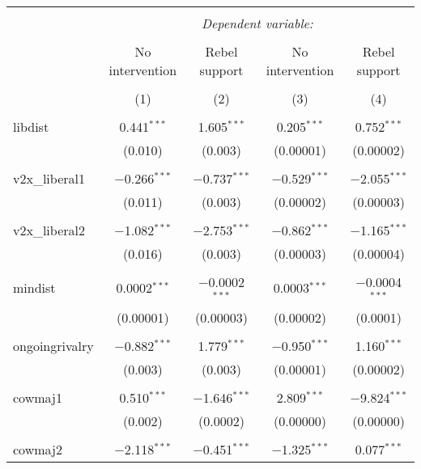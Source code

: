 
\begin{table}[!htbp] \centering 
  \caption{} 
  \label{} 
\begin{tabular}{@{\extracolsep{5pt}}lcccc} 
\\[-1.8ex]\hline 
\hline \\[-1.8ex] 
 & \multicolumn{4}{c}{\textit{Dependent variable:}} \\ 
\cline{2-5} 
\\[-1.8ex] & No intervention & Rebel support & No intervention & Rebel support \\ 
\\[-1.8ex] & (1) & (2) & (3) & (4)\\ 
\hline \\[-1.8ex] 
 libdist & 0.441$^{***}$ & 1.605$^{***}$ & 0.205$^{***}$ & 0.752$^{***}$ \\ 
  & (0.010) & (0.003) & (0.00001) & (0.00002) \\ 
  & & & & \\ 
 v2x\_liberal1 & $-$0.266$^{***}$ & $-$0.737$^{***}$ & $-$0.529$^{***}$ & $-$2.055$^{***}$ \\ 
  & (0.011) & (0.003) & (0.00002) & (0.00003) \\ 
  & & & & \\ 
 v2x\_liberal2 & $-$1.082$^{***}$ & $-$2.753$^{***}$ & $-$0.862$^{***}$ & $-$1.165$^{***}$ \\ 
  & (0.016) & (0.003) & (0.00003) & (0.00004) \\ 
  & & & & \\ 
 mindist & 0.0002$^{***}$ & $-$0.0002$^{***}$ & 0.0003$^{***}$ & $-$0.0004$^{***}$ \\ 
  & (0.00001) & (0.00003) & (0.00002) & (0.0001) \\ 
  & & & & \\ 
 ongoingrivalry & $-$0.882$^{***}$ & 1.779$^{***}$ & $-$0.950$^{***}$ & 1.160$^{***}$ \\ 
  & (0.003) & (0.003) & (0.00001) & (0.00002) \\ 
  & & & & \\ 
 cowmaj1 & 0.510$^{***}$ & $-$1.646$^{***}$ & 2.809$^{***}$ & $-$9.824$^{***}$ \\ 
  & (0.002) & (0.0002) & (0.00000) & (0.00000) \\ 
  & & & & \\ 
 cowmaj2 & $-$2.118$^{***}$ & $-$0.451$^{***}$ & $-$1.325$^{***}$ & 0.077$^{***}$ \\ 

\end{tabular}
\end{table}
